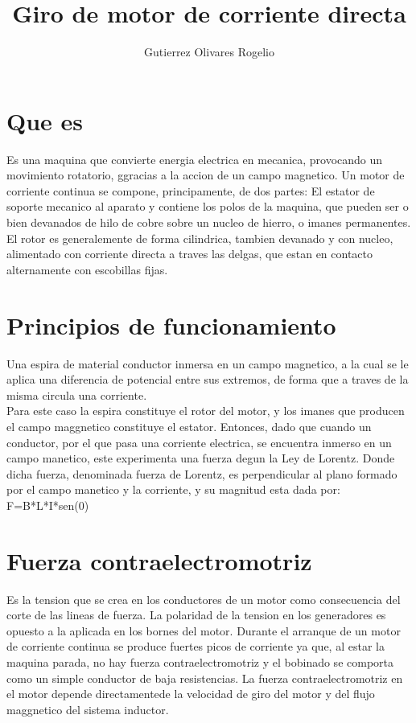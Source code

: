 \documentclass[12pt,a4paper]{report}
\author{Gutierrez Olivares Rogelio}
\title{Giro de motor de corriente directa}
\begin{document}
\maketitle
\section{Que es}
Es una maquina que convierte energia electrica en mecanica, provocando un movimiento rotatorio, ggracias a la accion de un campo magnetico.
Un motor de corriente continua se compone, principamente, de dos partes: El estator de soporte mecanico al aparato y contiene los polos de la maquina, que pueden ser o bien devanados de hilo de cobre sobre un nucleo de hierro, o imanes permanentes. El rotor es generalemente de forma cilindrica, tambien devanado y con nucleo, alimentado con corriente directa a traves las delgas, que estan en contacto alternamente con escobillas fijas.
\section{Principios de funcionamiento}
Una espira de material conductor inmersa en un campo magnetico, a la cual se le aplica una diferencia de potencial entre sus extremos, de forma que a traves de la misma circula una corriente.\\
Para este caso la espira constituye el rotor del motor, y los imanes que producen el campo maggnetico constituye el estator.
Entonces, dado que cuando un conductor, por el que pasa una corriente electrica, se encuentra inmerso en un campo manetico, este experimenta una fuerza degun la Ley de Lorentz. Donde dicha fuerza, denominada fuerza de Lorentz, es perpendicular al plano formado por el campo manetico y la corriente, y su magnitud esta dada por:\\
F=B*L*I*sen(0)
\section{Fuerza contraelectromotriz}
Es la tension que se crea en los conductores de un motor como consecuencia del corte de las lineas de fuerza. La polaridad de la tension en los generadores es opuesto a la aplicada en los bornes del motor. Durante el arranque de un motor de corriente continua se produce fuertes picos de corriente ya que, al estar la maquina parada, no hay fuerza contraelectromotriz y el bobinado se comporta como un simple conductor de baja resistencias. La fuerza contraelectromotriz en el motor depende directamentede la velocidad de giro del motor y del flujo maggnetico del sistema inductor.
\end{document}
